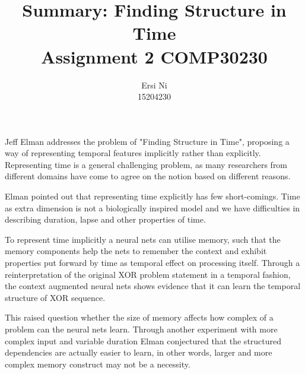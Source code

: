 \documentclass{scrartcl}
\title{Summary: Finding Structure in Time \\
 \large Assignment 2 COMP30230}
\author{Ersi Ni\\
\large 15204230}
\begin{document}
\maketitle


Jeff Elman addresses the problem of "Finding Structure in Time", proposing a way of representing temporal features implicitly rather than explicitly. Representing time is a general challenging problem, as many researchers from different domains have come to agree on the notion based on different reasons. 

Elman pointed out that representing time explicitly has few short-comings. Time as extra dimension is not a biologically inspired model and we have difficulties in describing duration, lapse and other properties of time. 

To represent time implicitly a neural nets can utilise memory, such that the memory components help the nets to remember the context and exhibit properties put forward by time as temporal effect on processing itself. Through a reinterpretation of the original XOR problem statement in a temporal fashion, the context augmented neural nets shows evidence that it can learn the temporal structure of XOR sequence. 

This raised question whether the size of memory affects how complex of a problem can the neural nets learn. Through another experiment with more complex input and variable duration Elman conjectured that the structured dependencies are actually easier to learn, in other words, larger and more complex memory construct may not be a necessity. 
\end{document}
